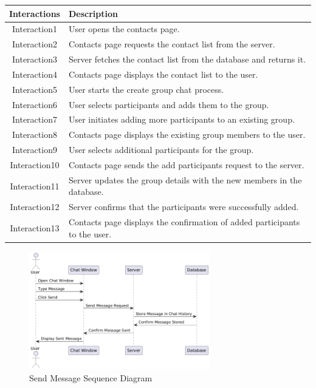 \begin{longtable}{|c|p{10cm}|}
    \hline
    \textbf{Interactions} & \textbf{Description} \\
    \hline
    Interaction1 & User opens the contacts page. \\
    \hline
    Interaction2 & Contacts page requests the contact list from the server. \\
    \hline
    Interaction3 & Server fetches the contact list from the database and returns it. \\
    \hline
    Interaction4 & Contacts page displays the contact list to the user. \\
    \hline
    Interaction5 & User starts the create group chat process. \\
    \hline
    Interaction6 & User selects participants and adds them to the group. \\
    \hline
    Interaction7 & User initiates adding more participants to an existing group. \\
    \hline
    Interaction8 & Contacts page displays the existing group members to the user. \\
    \hline
    Interaction9 & User selects additional participants for the group. \\
    \hline
    Interaction10 & Contacts page sends the add participants request to the server. \\
    \hline
    Interaction11 & Server updates the group details with the new members in the database. \\
    \hline
    Interaction12 & Server confirms that the participants were successfully added. \\
    \hline
    Interaction13 & Contacts page displays the confirmation of added participants to the user. \\
    \hline
\end{longtable}
\newpage

\begin{figure}[h]
    \centering
    \includegraphics[width=0.7\textwidth]{images/send_message.png} %
    \caption{Send Message Sequence Diagram}
    \label{fig:example}
\end{figure}


